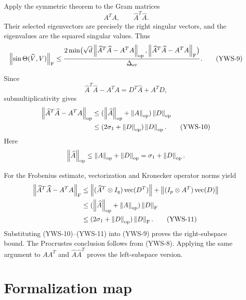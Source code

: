 Apply the symmetric theorem to the Gram matrices
\[
  A^TA,
  \qquad
  \widehat A^T\widehat A.
\]
Their selected eigenvectors are precisely the right singular vectors, and the eigenvalues are the squared singular values. Thus
\begin{equation}
  \left\lVert \sin\Theta(\widehat V,V)\right\rVert_{\mathrm{F}}
  \le
  \frac{2\min\bigl(
      \sqrt d\left\lVert \widehat A^T\widehat A-A^TA\right\rVert_{\mathrm{op}},
      \left\lVert \widehat A^T\widehat A-A^TA\right\rVert_{\mathrm{F}}
    \bigr)}{\Delta_{\mathrm{sv}}}. \tag{YWS-9}
\end{equation}

Since
\[
  \widehat A^T\widehat A-A^TA
  =D^T\widehat A+A^TD,
\]
submultiplicativity gives
\begin{align}
  \left\lVert \widehat A^T\widehat A-A^TA\right\rVert_{\mathrm{op}}
  &\le(\left\lVert \widehat A\right\rVert_{\mathrm{op}}+\left\lVert A\right\rVert_{\mathrm{op}})
       \left\lVert D\right\rVert_{\mathrm{op}}\notag\\
  &\le(2\sigma_1+\left\lVert D\right\rVert_{\mathrm{op}})\left\lVert D\right\rVert_{\mathrm{op}}. \tag{YWS-10}
\end{align}
Here
\[
  \left\lVert \widehat A\right\rVert_{\mathrm{op}}
  \le\left\lVert A\right\rVert_{\mathrm{op}}+\left\lVert D\right\rVert_{\mathrm{op}}
  =\sigma_1+\left\lVert D\right\rVert_{\mathrm{op}}.
\]

For the Frobenius estimate, vectorization and Kronecker operator norms yield
\begin{align}
  \left\lVert \widehat A^T\widehat A-A^TA\right\rVert_{\mathrm{F}}
  &\le
  \left\lVert (\widehat A^T\otimes I_q)
        \operatorname{vec}(D^T)\right\rVert
  +\left\lVert (I_p\otimes A^T)\operatorname{vec}(D)\right\rVert\notag\\
  &\le
  (\left\lVert \widehat A\right\rVert_{\mathrm{op}}+\left\lVert A\right\rVert_{\mathrm{op}})
  \left\lVert D\right\rVert_{\mathrm{F}}\notag\\
  &\le
  (2\sigma_1+\left\lVert D\right\rVert_{\mathrm{op}})\left\lVert D\right\rVert_{\mathrm{F}}. \tag{YWS-11}
\end{align}
Substituting (YWS-10)--(YWS-11) into (YWS-9) proves the right-subspace bound. The Procrustes conclusion follows from (YWS-8). Applying the same argument to $AA^T$ and $\widehat A\widehat A^T$ proves the left-subspace version.

\section{Formalization map}


